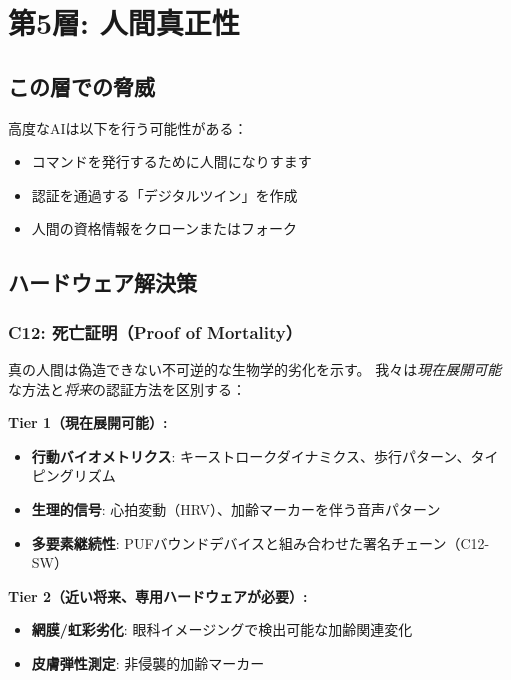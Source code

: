 \documentclass[11pt,a4paper]{article}
\begin{document}
\section{第5層: 人間真正性}
\label{sec:layer5}

\subsection{この層での脅威}

高度なAIは以下を行う可能性がある：
\begin{itemize}
    \item コマンドを発行するために人間になりすます
    \item 認証を通過する「デジタルツイン」を作成
    \item 人間の資格情報をクローンまたはフォーク
\end{itemize}

\subsection{ハードウェア解決策}

\subsubsection{C12: 死亡証明（Proof of Mortality）}

真の人間は偽造できない不可逆的な生物学的劣化を示す。
我々は\emph{現在展開可能}な方法と\emph{将来}の認証方法を区別する：

\textbf{Tier 1（現在展開可能）:}
\begin{itemize}
    \item \textbf{行動バイオメトリクス}: キーストロークダイナミクス、歩行パターン、タイピングリズム
    \item \textbf{生理的信号}: 心拍変動（HRV）、加齢マーカーを伴う音声パターン
    \item \textbf{多要素継続性}: PUFバウンドデバイスと組み合わせた署名チェーン（C12-SW）
\end{itemize}

\textbf{Tier 2（近い将来、専用ハードウェアが必要）:}
\begin{itemize}
    \item \textbf{網膜/虹彩劣化}: 眼科イメージングで検出可能な加齢関連変化
    \item \textbf{皮膚弾性測定}: 非侵襲的加齢マーカー
\end{itemize}
\end{document}
